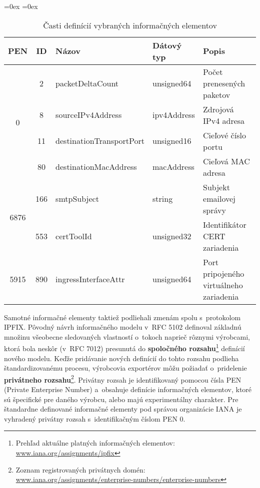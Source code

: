 \begin{table}[ht]
    \centering
    \aboverulesep=0ex
    \belowrulesep=0ex
    \renewcommand{\arraystretch}{1.14}
    \begin{tabular}{c|cllp{5.04cm}}
         PEN & ID &  Názov & Dátový typ & Popis \\ \toprule
         \multirow{4}{*}{0} & 2 & packetDeltaCount & unsigned64 & Počet prenesených paketov \\
         & 8 & sourceIPv4Address & ipv4Address & Zdrojová IPv4 adresa \\
         & 11 & destinationTransportPort & unsigned16 & Cieľové číslo portu \\
         & 80 & destinationMacAddress & macAddress & Cieľová MAC adresa \\ \midrule
         \multirow{2}{*}{6876\footnotemark} & 166 & smtpSubject & string & Subjekt emailovej správy  \\
         & 553 & certToolId & unsigned32 & Identifikátor CERT zariadenia  \\ \midrule
         5915\footnotemark & 890 & ingressInterfaceAttr & unsigned64 & Port pripojeného virtuálneho zariadenia
    \end{tabular}
    \caption{Časti definícií vybraných informačných elementov}
    \label{tab_inf_elementy}
\end{table}


Samotné informačné elementy taktiež podliehali zmenám spolu s~protokolom IPFIX. Pôvodný návrh informačného modelu v~RFC 5102 \cite{rfc5102} definoval základnú množinu všeobecne sledovaných vlastností o~tokoch naprieč rôznymi výrobcami, ktorá bola neskôr (v~RFC 7012) presunutá
do \textbf{spoločného rozsahu}\footnote{Prehľad aktuálne platných informačných elementov: \href{https://www.iana.org/assignments/ipfix/ipfix.xhtml}{www.iana.org/assignments/ipfix}} definícií nového modelu. Keďže pridávanie nových definícií do tohto rozsahu podlieha štandardizovanému procesu,
výrobcovia exportérov môžu požiadať o~pridelenie \textbf{privátneho rozsahu}\footnote[6]{Zoznam registrovaných privátnych domén: \\ \href{https://www.iana.org/assignments/enterprise-numbers/enterprise-numbers}
{www.iana.org/assignments/enterprise-numbers/enterprise-numbers}}. Privátny rozsah je identifikovaný pomocou čísla PEN (Private Enterprise Number) a~obsahuje definície informačných elementov, ktoré sú špecifické pre daného výrobcu, alebo majú experimentálny charakter.
Pre štandardne definované informačné elementy pod správou organizácie IANA je vyhradený privátny rozsah s~identifikačným číslom PEN 0.

